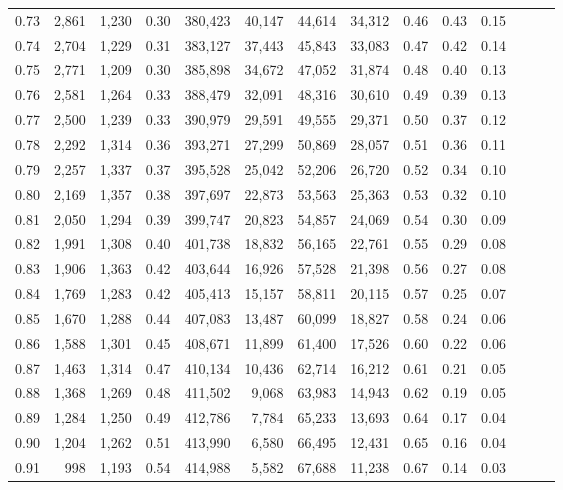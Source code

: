 \begin{tabular}{rrrrrrrrrrrrrr}
0.73 &  2,861 &  1,230 &  0.30 &  380,423 &   40,147 &  44,614 &  34,312 &  0.46 &  0.43 &      0.15 \\
0.74 &  2,704 &  1,229 &  0.31 &  383,127 &   37,443 &  45,843 &  33,083 &  0.47 &  0.42 &      0.14 \\
0.75 &  2,771 &  1,209 &  0.30 &  385,898 &   34,672 &  47,052 &  31,874 &  0.48 &  0.40 &      0.13 \\
0.76 &  2,581 &  1,264 &  0.33 &  388,479 &   32,091 &  48,316 &  30,610 &  0.49 &  0.39 &      0.13 \\
0.77 &  2,500 &  1,239 &  0.33 &  390,979 &   29,591 &  49,555 &  29,371 &  0.50 &  0.37 &      0.12 \\
0.78 &  2,292 &  1,314 &  0.36 &  393,271 &   27,299 &  50,869 &  28,057 &  0.51 &  0.36 &      0.11 \\
0.79 &  2,257 &  1,337 &  0.37 &  395,528 &   25,042 &  52,206 &  26,720 &  0.52 &  0.34 &      0.10 \\
0.80 &  2,169 &  1,357 &  0.38 &  397,697 &   22,873 &  53,563 &  25,363 &  0.53 &  0.32 &      0.10 \\
0.81 &  2,050 &  1,294 &  0.39 &  399,747 &   20,823 &  54,857 &  24,069 &  0.54 &  0.30 &      0.09 \\
0.82 &  1,991 &  1,308 &  0.40 &  401,738 &   18,832 &  56,165 &  22,761 &  0.55 &  0.29 &      0.08 \\
0.83 &  1,906 &  1,363 &  0.42 &  403,644 &   16,926 &  57,528 &  21,398 &  0.56 &  0.27 &      0.08 \\
0.84 &  1,769 &  1,283 &  0.42 &  405,413 &   15,157 &  58,811 &  20,115 &  0.57 &  0.25 &      0.07 \\
0.85 &  1,670 &  1,288 &  0.44 &  407,083 &   13,487 &  60,099 &  18,827 &  0.58 &  0.24 &      0.06 \\
0.86 &  1,588 &  1,301 &  0.45 &  408,671 &   11,899 &  61,400 &  17,526 &  0.60 &  0.22 &      0.06 \\
0.87 &  1,463 &  1,314 &  0.47 &  410,134 &   10,436 &  62,714 &  16,212 &  0.61 &  0.21 &      0.05 \\
0.88 &  1,368 &  1,269 &  0.48 &  411,502 &    9,068 &  63,983 &  14,943 &  0.62 &  0.19 &      0.05 \\
0.89 &  1,284 &  1,250 &  0.49 &  412,786 &    7,784 &  65,233 &  13,693 &  0.64 &  0.17 &      0.04 \\
0.90 &  1,204 &  1,262 &  0.51 &  413,990 &    6,580 &  66,495 &  12,431 &  0.65 &  0.16 &      0.04 \\
0.91 &    998 &  1,193 &  0.54 &  414,988 &    5,582 &  67,688 &  11,238 &  0.67 &  0.14 &      0.03 \\

\end{tabular}
